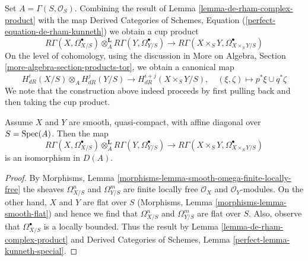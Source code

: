 \noindent
Set $A = \Gamma(S, \mathcal{O}_S)$. Combining the result of
Lemma \ref{lemma-de-rham-complex-product} with the map
Derived Categories of Schemes, Equation
(\ref{perfect-equation-de-rham-kunneth})
we obtain a cup product
$$
R\Gamma(X, \Omega^\bullet_{X/S})
\otimes_A^\mathbf{L}
R\Gamma(Y, \Omega^\bullet_{Y/S})
\longrightarrow
R\Gamma(X \times_S Y, \Omega^\bullet_{X \times_S Y/S})
$$
On the level of cohomology, using the discussion in
More on Algebra, Section \ref{more-algebra-section-products-tor},
we obtain a canonical map
$$
H^i_{dR}(X/S) \otimes_A H^j_{dR}(Y/S)
\longrightarrow
H^{i + j}_{dR}(X \times_S Y/S),\quad
(\xi, \zeta) \longmapsto p^*\xi \cup q^*\zeta
$$
We note that the construction above indeed proceeds by
first pulling back and then taking the cup product.

\begin{lemma}
\label{lemma-kunneth-de-rham}
Assume $X$ and $Y$ are smooth, quasi-compact, with affine diagonal over
$S = \mathop{\mathrm{Spec}}(A)$. Then the map
$$
R\Gamma(X, \Omega^\bullet_{X/S})
\otimes_A^\mathbf{L}
R\Gamma(Y, \Omega^\bullet_{Y/S})
\longrightarrow
R\Gamma(X \times_S Y, \Omega^\bullet_{X \times_S Y/S})
$$
is an isomorphism in $D(A)$.
\end{lemma}

\begin{proof}
By Morphisms, Lemma \ref{morphisms-lemma-smooth-omega-finite-locally-free}
the sheaves $\Omega^n_{X/S}$ and $\Omega^m_{Y/S}$ are finite locally free
$\mathcal{O}_X$ and $\mathcal{O}_Y$-modules. On the other hand, $X$ and $Y$
are flat over $S$ (Morphisms, Lemma \ref{morphisms-lemma-smooth-flat})
and hence we find that $\Omega^n_{X/S}$ and $\Omega^m_{Y/S}$ are flat over $S$.
Also, observe that $\Omega^\bullet_{X/S}$ is a locally bounded. Thus
the result by Lemma \ref{lemma-de-rham-complex-product} and
Derived Categories of Schemes, Lemma \ref{perfect-lemma-kunneth-special}.
\end{proof}

